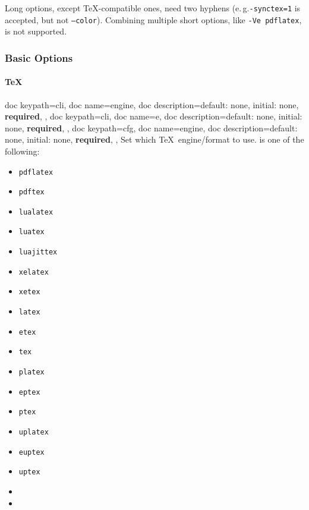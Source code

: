 \documentclass[a4paper, 11pt]{scrartcl}
\newcommand\eg{e.\,g.\xspace}
\let\TeXold\TeX
\renewcommand\TeX{\TeXold\xspace}
\begin{document}
Long options, except \TeX-compatible ones, need two hyphens (\eg \texttt{-synctex=1} is accepted, but not \texttt{--color}).
Combining multiple short options, like \texttt{-Ve pdflatex}, is not supported.

\subsubsection{Basic Options}

\paragraph{\TeX}
\begin{docKeys}[
		doc parameter={=\meta{engine}},
	]{
		{
			doc keypath=cli,
			doc name=engine,
			doc description={default: none, initial: none, \textcolor{CtpRed}{\bfseries\sffamily required}},
		},
		{
			doc keypath=cli,
			doc name=e,
			doc description={default: none, initial: none, \textcolor{CtpRed}{\bfseries\sffamily required}},
		},
		{
			doc keypath=cfg,
			doc name=engine,
			doc description={default: none, initial: none, \textcolor{CtpRed}{\bfseries\sffamily required}},
		},
	}
	Set which \TeX\ engine/format to use.
	 is one of the following:
	\begin{multicols}{3}
		\begin{itemize}
			\item \texttt{pdflatex}
			\item \texttt{pdftex}
			\item \texttt{lualatex}
			\item \texttt{luatex}
			\item \texttt{luajittex}
			\item \texttt{xelatex}
			\item \texttt{xetex}
			\item \texttt{latex}
			\item \texttt{etex}
			\item \texttt{tex}
			\item \texttt{platex}
			\item \texttt{eptex}
			\item \texttt{ptex}
			\item \texttt{uplatex}
			\item \texttt{euptex}
			\item \texttt{uptex}
			\item[]
			\item[]
		\end{itemize}
	\end{multicols}
\end{docKeys}
\end{document}

